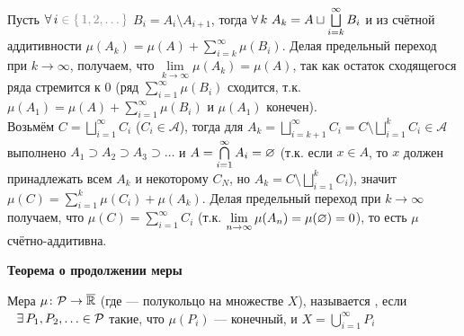 \begin{prf}
	 Пусть $\A i  \uns{{}\in \{\,1, 2, \ldots\,\}}$ $B_i = A_i \setminus A_{i+1}$, тогда $\forall \, k\ A_k = A \sqcup \bigsqcup\limits_{i = k}^\infty B_i$ и из счётной аддитивности $\mu(A_k) = \mu(A) + \sum\limits_{i = k}^\infty \mu(B_i)$. Делая предельный переход при $k \to \infty$, получаем, что $\lim\limits_{k \to \infty} \mu(A_k) = \mu(A)$, так как остаток сходящегося ряда стремится к 0 (ряд $\sum\limits_{i = 1}^\infty \mu(B_i)$ сходится, т.к. $\mu(A_1) = \mu(A) + \sum\limits_{i = 1}^\infty \mu(B_i)$ и $\mu(A_1)$ конечен).\\[5pt]
	 Возьмём $C = \bigsqcup\limits_{i = 1}^\infty C_i$ ($C_i \in \mathcal{A}$), тогда для $A_k = \bigsqcup\limits_{i = k + 1}^\infty C_i = C \setminus \bigsqcup\limits_{i = 1}^k C_i \in \mathcal A$ выполнено $A_1 \supset A_2 \supset A_3 \supset \ldots$ и $A = \bigcap\limits_{i = 1}^\infty A_i = \varnothing$ (т.к. если $x \in A$, то $x$ должен принадлежать всем $A_k$ и некоторому $C_N$, но $A_k = C \setminus \bigsqcup\limits_{i = 1}^k C_i$), значит $\mu(C) = \sum\limits_{i = 1}^k \mu(C_i) + \mu(A_k)$. Делая предельный переход при $k \to \infty$ получаем, что $\mu(C) = \sum\limits_{i = 1}^\infty C_i$ (т.к. $\lim\limits_{n \to \infty} \mu(A_n) = \mu(\varnothing) = 0$), то есть $\mu$ счётно-аддитивна.
\end{prf}

\begin{center}
	\textbf{Теорема о продолжении меры}
\end{center}

\begin{opr}
	Мера $\mu \colon \mathcal{P} \to \overline{\mathbb R}$ (где \p --- полукольцо на множестве $X$), называется , если$\E P_1, P_2, \ldots \in \p$ такие, что  $\mu(P_i)$ --- конечный, и $X = \bigcup\limits_{i = 1}^\infty P_i$
\end{opr}

